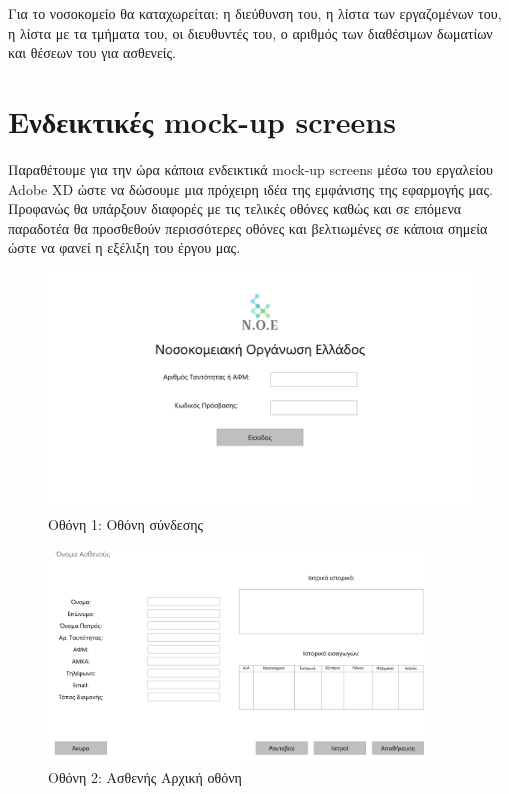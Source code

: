 \documentclass[12pt,a4paper,oneside]{article}
\begin{document}
\hspace{1cm} Για το νοσοκομείο θα καταχωρείται: η διεύθυνση του, η λίστα των εργαζομένων του, η λίστα με τα τμήματα του, οι διευθυντές του, ο αριθμός των διαθέσιμων δωματίων και θέσεων του για ασθενείς. 


\newpage

\section{Eνδεικτικές mock-up screens}\label{sec:lit-rev}
 Παραθέτουμε για την ώρα κάποια ενδεικτικά mock-up screens μέσω του εργαλείου Adobe XD ώστε να δώσουμε μια πρόχειρη ιδέα της εμφάνισης της εφαρμογής μας. Προφανώς θα υπάρξουν διαφορές με τις τελικές οθόνες καθώς και σε επόμενα παραδοτέα θα προσθεθούν περισσότερες οθόνες και βελτιωμένες σε κάποια σημεία ώστε να φανεί η εξέλιξη του έργου μας.
\newline

\begin{figure}[h!]
\centering
\includegraphics[width=1.\textwidth]{Οθόνη σύνδεσης.pdf}
\captionsetup{labelformat=empty}
\caption{Οθόνη 1: Οθόνη σύνδεσης}
\end{figure}


\begin{figure}[h!]
\centering
\includegraphics[width=0.9\textwidth]{Ασθενής Αρχική οθόνη.pdf}
\captionsetup{labelformat=empty}
\caption{Οθόνη 2: Ασθενής Αρχική οθόνη}
\end{figure}
\end{document}
